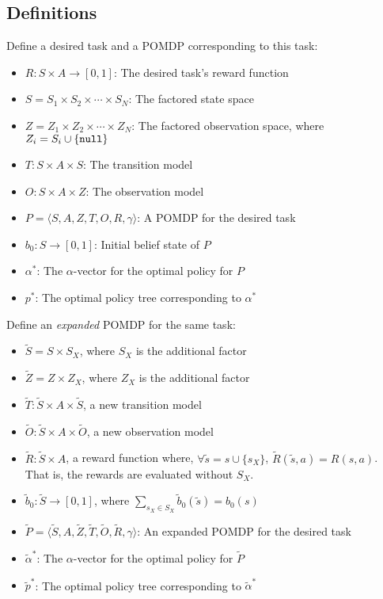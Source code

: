 \documentclass{article}
\newcommand{\td}[1]{\tilde{#1}}
\begin{document}
\subsection{Definitions}
Define a desired task and a POMDP corresponding to this task:
\begin{itemize}
\item $R:S\times A\rightarrow[0,1]$: The desired task's reward function
\item $S=S_1\times S_2\times\cdots\times S_N$: The factored state space
\item $Z=Z_1\times Z_2\times\cdots\times Z_N$: The factored observation space, where $Z_i=S_i\cup\{\texttt{null}\}$
\item $T:S\times A\times S$: The transition model
\item $O:S\times A\times Z$: The observation model
\item $P=\langle S,A,Z,T,O,R,\gamma  \rangle$: A POMDP for the desired task
\item $b_0: S\rightarrow [0,1]$: Initial belief state of $P$
\item $\alpha^*$: The $\alpha$-vector for the optimal policy for $P$
\item $p^*$: The optimal policy tree corresponding to $\alpha^*$
\end{itemize}

\noindent Define an \emph{expanded} POMDP for the same task:
\begin{itemize}
\item $\td{S} = S\times S_X$, where $S_X$ is the additional factor
\item $\td{Z} = Z\times Z_X$, where $Z_X$ is the additional factor
\item $\td{T}: \td{S}\times A\times\td{S}$, a new transition model
\item $\td{O}: \td{S}\times A\times\td{O}$, a new observation model
\item $\td{R}: \td{S}\times A$, a reward function where, $\forall \td{s}=s\cup\{s_X\}$, $\td{R}(\td{s},a)=R(s,a)$. That is, the rewards are evaluated without $S_X$.
\item $\td{b}_0:\td{S}\rightarrow [0,1]$, where $\sum_{s_X\in S_X}\td{b}_0(\td{s})=b_0(s)$
\item $\td{P}=\langle \td{S},A,\td{Z},\td{T},\td{O},\td{R},\gamma  \rangle$: An expanded POMDP for the desired task
\item $\td{\alpha}^*$: The $\alpha$-vector for the optimal policy for $\td{P}$
\item $\td{p}^*$: The optimal policy tree corresponding to $\td{\alpha}^*$
\end{itemize}
\end{document}
